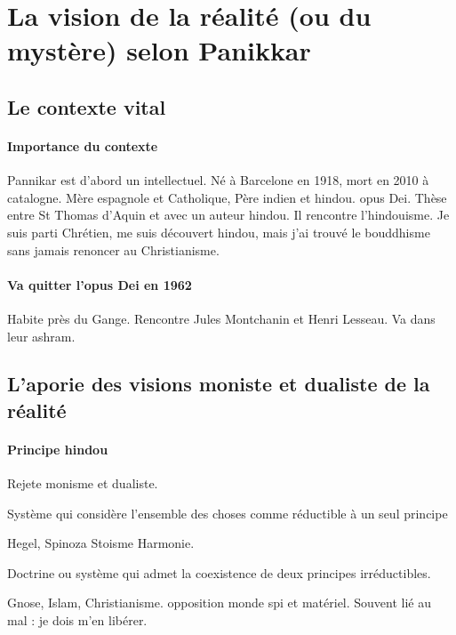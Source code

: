 \section{La vision de la réalité (ou du mystère) selon Panikkar}


\subsection{Le contexte vital}

\paragraph{Importance du contexte} Pannikar est d'abord un intellectuel. Né à Barcelone en 1918, mort en 2010 à catalogne. Mère espagnole et Catholique, Père indien et hindou. opus Dei. 
Thèse entre St Thomas d'Aquin et avec un auteur hindou.
Il rencontre l'hindouisme. Je suis parti Chrétien, me suis découvert hindou, mais j'ai trouvé le bouddhisme sans jamais renoncer au Christianisme.

\paragraph{Va quitter l'opus Dei en 1962} Habite près du Gange. Rencontre Jules Montchanin et Henri Lesseau. Va dans leur ashram.



 
\subsection{L’aporie des visions moniste et dualiste de la réalité}

\paragraph{Principe hindou} Rejete monisme et dualiste. 


\begin{Def}[monisme]
Système qui considère l'ensemble des choses comme réductible à un seul principe  
\end{Def}
\begin{Ex}
Hegel, Spinoza
Stoisme
Harmonie. 
\end{Ex}
 \begin{Def}[Dualisme]
 
 Doctrine ou système qui admet la coexistence de deux principes irréductibles.
\end{Def}
\begin{Ex}
    Gnose, Islam, Christianisme.
    opposition monde spi et matériel.
    Souvent lié au mal : je dois m'en libérer.
\end{Ex}

